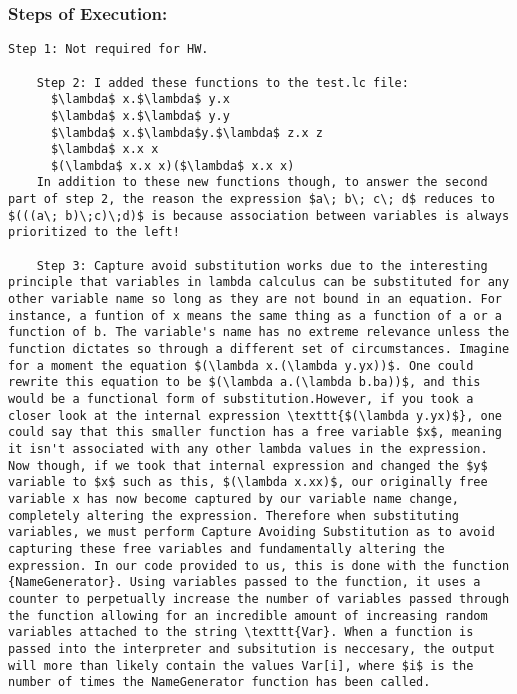 \documentclass{article}
\theoremstyle{theorem}
\theoremstyle{definition}
\theoremstyle{remark}
\begin{document}
  
  \subsubsection*{Steps of Execution:}
  \begin{lstlisting}[mathescape=true]
    Step 1: Not required for HW.
    
    Step 2: I added these functions to the test.lc file:
      $\lambda$ x.$\lambda$ y.x
      $\lambda$ x.$\lambda$ y.y
      $\lambda$ x.$\lambda$y.$\lambda$ z.x z
      $\lambda$ x.x x
      $(\lambda$ x.x x)($\lambda$ x.x x)
    In addition to these new functions though, to answer the second part of step 2, the reason the expression $a\; b\; c\; d$ reduces to $(((a\; b)\;c)\;d)$ is because association between variables is always prioritized to the left!
    
    Step 3: Capture avoid substitution works due to the interesting principle that variables in lambda calculus can be substituted for any other variable name so long as they are not bound in an equation. For instance, a funtion of x means the same thing as a function of a or a function of b. The variable's name has no extreme relevance unless the function dictates so through a different set of circumstances. Imagine for a moment the equation $(\lambda x.(\lambda y.yx))$. One could rewrite this equation to be $(\lambda a.(\lambda b.ba))$, and this would be a functional form of substitution.However, if you took a closer look at the internal expression \texttt{$(\lambda y.yx)$}, one could say that this smaller function has a free variable $x$, meaning it isn't associated with any other lambda values in the expression. Now though, if we took that internal expression and changed the $y$ variable to $x$ such as this, $(\lambda x.xx)$, our originally free variable x has now become captured by our variable name change, completely altering the expression. Therefore when substituting variables, we must perform Capture Avoiding Substitution as to avoid capturing these free variables and fundamentally altering the expression. In our code provided to us, this is done with the function {NameGenerator}. Using variables passed to the function, it uses a counter to perpetually increase the number of variables passed through the function allowing for an incredible amount of increasing random variables attached to the string \texttt{Var}. When a function is passed into the interpreter and subsitution is neccesary, the output will more than likely contain the values Var[i], where $i$ is the number of times the NameGenerator function has been called.
  

\end{lstlisting}
\end{document}
